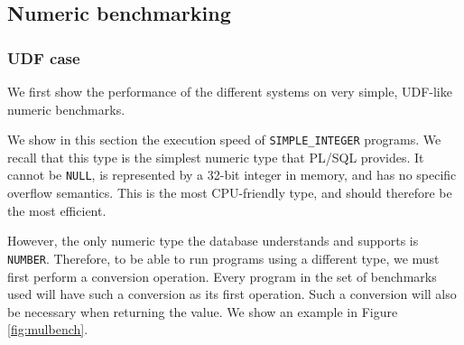 \documentclass[twoside,11pt,a4paper]{article}
\newcommand{\pls}[1]{\small\texttt{#1}\normalsize}
\newcommand{\plstype}[1]{\pls{#1}}
\newcommand{\oranum}{\plstype{NUMBER}}
\newcommand{\simpleint}{\plstype{SIMPLE\_INTEGER}}
\newcommand{\plsnull}{\pls{NULL}}
\newcommand{\benchsystem}[1]{\textsf{#1}}
\newcommand{\ncpg}{\benchsystem{ncomp-pragma}}
\begin{document}
\subsection{Numeric benchmarking}


\subsubsection{UDF case}

We first show the performance of the different systems on very simple, UDF-like numeric benchmarks.

We show in this section the execution speed of \simpleint{} programs. We recall that this type is the simplest numeric type that PL/SQL provides. It cannot be \plsnull{}, is represented by a 32-bit integer in memory, and has no specific overflow semantics. This is the most CPU-friendly type, and should therefore be the most efficient.

However, the only numeric type the database understands and supports is \oranum{}. Therefore, to be able to run programs using a different type, we must first perform a conversion operation. Every program in the set of benchmarks used will have such a conversion as its first operation. Such a conversion will also be necessary when returning the value. We show an example in Figure \ref{fig:mulbench}.
\end{document}

